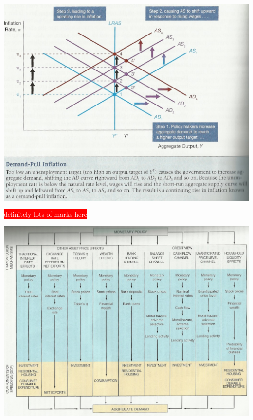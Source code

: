 \documentclass[12pt]{examnotes}
\begin{document}
\begin{center}
    \includegraphics[scale=0.4]{./imgs/c24f10.jpg}
\end{center}
\colorbox{red}{\textcolor{white}{definitely lots of marks here}}



\begin{center}
  \includegraphics[scale=0.5]{./imgs/c26f1.jpg}
\end{center}
\end{document}
